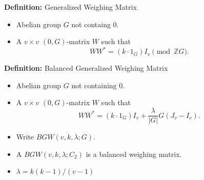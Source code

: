 \documentclass{beamer}
\newcommand{\abs}[1]{|#1|}
\begin{document}
\begin{frame}

  \begin{block}{{\bf Definition:} Generalized Weighing Matrix}
    \begin{itemize}
    \item Abelian group $G$ not containg $0$.
    \item A $v \times v$ $(0,G)$-matrix $W$ such that
      \[
        WW^* = (k \cdot 1_G)I_v \pmod{\mathbb{Z}G}.
      \]
    \end{itemize}
  \end{block}

  \begin{block}{{\bf Definition:} Balanced Generalized Weighing Matrix}
    \begin{itemize}
    \item Abelian group $G$ not containing $0$.
    \item A $v \times v$ $(0,G)$-matrix $W$ such that
      \[
        WW^* = (k \cdot 1_G)I_v + \frac{\lambda}{\abs{G}}G(J_v-I_v).
      \]
    \item Write $BGW(v,k,\lambda; G)$.
    \end{itemize}
  \end{block}

  \begin{itemize}
  \item A $BGW(v,k,\lambda;C_2)$ is a balanced weighing matrix. 
  \item $\lambda = k(k-1)/(v-1)$
  \end{itemize}
  
\end{frame}


  
\end{document}
